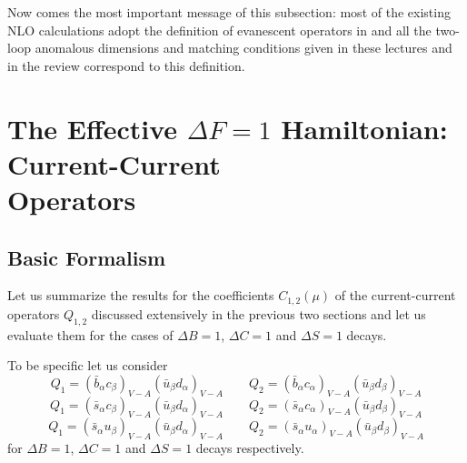 \documentclass[12pt,rotate]{article}
\begin{document}
\begin{itemize}
\begin{itemize}
Now comes the most important message of this subsection: 
most of the existing NLO calculations adopt the definition of
evanescent operators in \cite{WEISZ} and all the two-loop
anomalous dimensions and matching conditions given in these
lectures and in the review \cite{BBL} correspond to this definition.

\section{The Effective $\Delta F=1$ Hamiltonian: 
        Current-Current \\ Operators}
   \label{sec:HeffdF1:22}
\setcounter{equation}{0}
\subsection{Basic Formalism}
Let us summarize the results for the coefficients $C_{1,2}(\mu)$ of
the current-current operators $Q_{1,2}$ discussed extensively in the
previous two sections and let us evaluate them for the cases of
$\Delta B=1$, $\Delta C=1$ and $\Delta S=1$ decays.

To be specific let us consider
\begin{equation}\label{B1}
Q_1=(\bar b_\alpha c_\beta)_{V-A} (\bar u_\beta d_\alpha)_{V-A}
\qquad 
Q_2=(\bar b_\alpha c_\alpha)_{V-A} (\bar u_\beta d_\beta)_{V-A}
\end{equation}
\begin{equation}\label{B2}
Q_1=(\bar s_\alpha c_\beta)_{V-A} (\bar u_\beta d_\alpha)_{V-A}
\qquad 
Q_2=(\bar s_\alpha c_\alpha)_{V-A} (\bar u_\beta d_\beta)_{V-A}
\end{equation}
\begin{equation}\label{B3}
Q_1=(\bar s_\alpha u_\beta)_{V-A} (\bar u_\beta d_\alpha)_{V-A}
\qquad 
Q_2=(\bar s_\alpha u_\alpha)_{V-A} (\bar u_\beta d_\beta)_{V-A}
\end{equation}
for $\Delta B=1$, $\Delta C=1$ and $\Delta S=1$ decays respectively.


\end{itemize}
\end{itemize}
\end{document}
